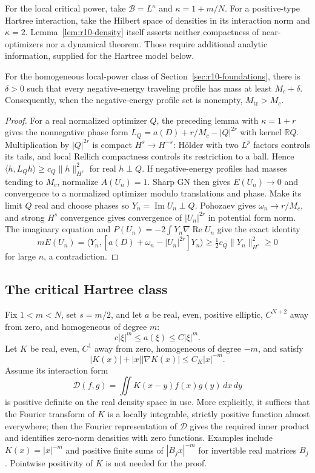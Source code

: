For the local critical power, take
$\mathcal B=L^{\kappa}$ and $\kappa=1+m/N$.
For a positive-type Hartree interaction, take the Hilbert space of
densities in its interaction norm and $\kappa=2$.
Lemma~\ref{lem:r10-density} itself asserts neither compactness of
near-optimizers nor a dynamical theorem. Those require additional
analytic information, supplied for the Hartree model below.

\begin{corollary}
For the homogeneous local-power class of Section~\ref{sec:r10-foundations},
there is $\delta>0$ such that every negative-energy traveling profile
has mass at least $M_c+\delta$. Consequently, when the negative-energy
profile set is nonempty, $M_{\mathrm{tr}}>M_c$.
\end{corollary}
\begin{proof}
For a real normalized optimizer $Q$, the preceding lemma with
$\kappa=1+r$ gives the nonnegative phase form
$L_Q=a(D)+r/M_c-|Q|^{2r}$ with kernel $\mathbb RQ$.
Multiplication by $|Q|^{2r}$ is compact $H^s\to H^{-s}$:
H\"older with two $L^p$ factors controls its tails, and local
Rellich compactness controls its restriction to a ball. Hence
$\langle h,L_Qh\rangle\ge c_Q\|h\|_{H^s}^2$ for real $h\perp Q$.
If negative-energy profiles had masses tending to $M_c$, normalize
$A(U_n)=1$. Sharp GN then gives $E(U_n)\to0$ and convergence to a
normalized optimizer modulo translations and phase. Make its limit
$Q$ real and choose phases so $Y_n=\operatorname{Im}U_n\perp Q$.
Pohozaev gives $\omega_n\to r/M_c$, and strong $H^s$ convergence
gives convergence of $|U_n|^{2r}$ in potential form norm.
The imaginary equation and $P(U_n)=-2\int Y_n\nabla\operatorname{Re}U_n$
give the exact identity
\[
 mE(U_n)=\langle Y_n,[a(D)+\omega_n-|U_n|^{2r}]Y_n\rangle
 \ge\tfrac12c_Q\|Y_n\|_{H^s}^2\ge0
\]
for large $n$, a contradiction.
\end{proof}

\subsection{The critical Hartree class}

Fix $1<m<N$, set $s=m/2$, and let $a$ be real, even, positive elliptic,
$C^{N+2}$ away from zero, and homogeneous of degree $m$:
\[
 c|\xi|^m\le a(\xi)\le C|\xi|^m.
\]
Let $K$ be real, even, $C^1$ away from zero, homogeneous of degree
$-m$, and satisfy
\begin{equation}\label{r10:kernel-bounds}
 |K(x)|+|x||\nabla K(x)|\le C_K|x|^{-m}.
\end{equation}
Assume its interaction form
\[
 \mathcal D(f,g)=\iint K(x-y)f(x)g(y)\,dx\,dy
\]
is positive definite on the real density space in use. More
explicitly, it suffices that the Fourier transform of $K$ is a
locally integrable, strictly positive function almost everywhere;
then the Fourier representation of $\mathcal D$ gives the required
inner product and identifies zero-norm densities with zero functions.
Examples include $K(x)=|x|^{-m}$ and positive finite sums of
$|B_jx|^{-m}$ for invertible real matrices $B_j$.
Pointwise positivity of $K$ is not needed for the proof.

